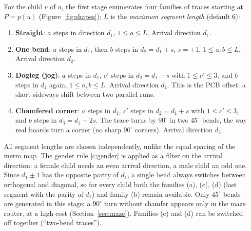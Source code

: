 \documentclass[11pt,a4paper]{article}
\theoremstyle{remark}
\newcommand{\pos}{p}
\begin{document}
For the child $v$ of $u$, the first stage enumerates four families of traces starting at $P=\pos(u)$
(Figure~\ref{fig:shapes}); $L$ is the \emph{maximum segment length} (default $6$):
\begin{enumerate}[label=(\alph*),nosep]
  \item \textbf{Straight}: $a$ steps in direction $d_1$, $1\le a\le L$. Arrival direction $d_1$.
  \item \textbf{One bend}: $a$ steps in $d_1$, then $b$ steps in $d_2=d_1+s$, $s=\pm1$, $1\le a,b\le L$.
        Arrival direction $d_2$.
  \item \textbf{Dogleg (jog)}: $a$ steps in $d_1$, $c'$ steps in $d_2=d_1+s$ with $1\le c'\le 3$, and $b$ steps
        in $d_1$ again, $1\le a,b\le L$. Arrival direction $d_1$. This is the PCB offset: a short sideways shift
        between two parallel runs.
  \item \textbf{Chamfered corner}: $a$ steps in $d_1$, $c'$ steps in $d_2=d_1+s$ with $1\le c'\le 3$, and $b$ steps
        in $d_3=d_1+2s$. The trace turns by $90^\circ$ in two $45^\circ$ bends, the way real boards turn a corner
        (no sharp $90^\circ$ corners). Arrival direction $d_3$.
\end{enumerate}
All segment lengths are chosen independently, unlike the equal spacing of the metro map. The gender rule
\ref{c:gender} is applied as a filter on the arrival direction: a female child needs an even arrival direction, a
male child an odd one. Since $d_1\pm1$ has the opposite parity of $d_1$, a single bend always switches between
orthogonal and diagonal, so for every child both the families (a), (c), (d) (last segment with the parity of $d_1$)
and family (b) remain available. Only $45^\circ$ bends are generated in this stage; a $90^\circ$ turn without
chamfer appears only in the maze router, at a high cost (Section~\ref{sec:maze}). Families (c) and (d) can be switched
off together (``two-bend traces'').
\end{document}

